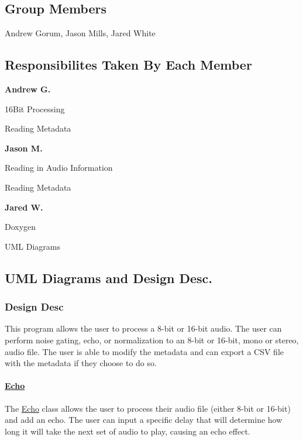 \subsection*{Group Members}

Andrew Gorum, Jason Mills, Jared White

\subsection*{Responsibilites Taken By Each Member}

{\bfseries Andrew G.}
\begin{DoxyEnumerate}
\item 16\+Bit Processing
\item Reading Metadata
\end{DoxyEnumerate}

{\bfseries Jason M.}
\begin{DoxyEnumerate}
\item Reading in Audio Information
\item Reading Metadata
\end{DoxyEnumerate}

{\bfseries Jared W.}
\begin{DoxyEnumerate}
\item Doxygen
\item U\+ML Diagrams
\end{DoxyEnumerate}

\subsection*{U\+ML Diagrams and Design Desc.}



\subsubsection*{Design Desc}

This program allows the user to process a 8-\/bit or 16-\/bit audio. The user can perform noise gating, echo, or normalization to an 8-\/bit or 16-\/bit, mono or stereo, audio file. The user is able to modify the metadata and can export a C\+SV file with the metadata if they choose to do so.

\paragraph*{\hyperlink{classEcho}{Echo}}

The {\ttfamily \hyperlink{classEcho}{Echo}} class allows the user to process their audio file (either 8-\/bit or 16-\/bit) and add an echo. The user can input a specific {\ttfamily delay} that will determine how long it will take the next set of audio to play, causing an echo effect.

